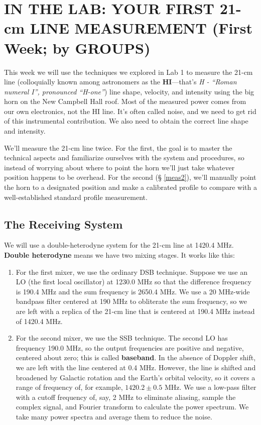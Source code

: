 \documentclass[11pt,preprint]{aastex}
\begin{document}
\section{IN THE LAB: YOUR FIRST 21-cm LINE MEASUREMENT (First Week; by GROUPS)} 
\label{radioastro}

This week we will use the techniques we explored in Lab 1 to measure the
21-cm line (colloquially known among astronomers as the {\bf
  HI}---that's {\it H - ``Roman numeral I'', pronounced ``H-one''}) line
shape, velocity, and intensity using the big horn on the New Campbell Hall roof.
Most of the measured power comes from our own electronics, not the HI
line.  It's often called noise, and we need to get rid of this
instrumental contribution. We also need to obtain the correct line shape
and intensity.

We'll measure the 21-cm line twice. For the first, the goal is to master
the technical aspects and familiarize ourselves with the system and
procedures, so instead of worrying about where to point the horn we'll
just take whatever position happens to be overhead. For the second (\S
\ref{meas2}), we'll manually point the horn to a designated position and
make a calibrated profile to compare with a well-established standard
profile measurement.

\subsection{The Receiving System}
We will use a double-heterodyne system for the 21-cm line at 1420.4 MHz.
{\bf Double heterodyne} means we have two mixing stages.  It works
like this: \begin{enumerate}

\item For the first mixer, we use the ordinary DSB technique. Suppose we
  use an LO (the first local oscillator) at 1230.0 MHz so that the
  difference frequency is 190.4 MHz and the sum frequency is 2650.4 MHz.
  We use a 20 MHz-wide bandpass filter centered at 190 MHz to obliterate
  the sum frequency, so we are left with a replica of the 21-cm line
  that is centered at 190.4 MHz instead of 1420.4 MHz.

\item For the second mixer, we use the SSB technique. The second
  LO has frequency 190.0 MHz, so the output frequencies are positive
  and negative, centered about zero; this is called {\bf baseband}. In the
  absence of Doppler shift, we are left with the line centered at 0.4
  MHz. However, the line is shifted and broadened by Galactic rotation
  and the Earth's orbital velocity, so it covers a range of frequency
  of, for example, $1420.2 \pm 0.5$ MHz. We use a low-pass filter with a
  cutoff frequency of, say, 2 MHz to
  eliminate aliasing, sample the complex signal, and Fourier transform
  to calculate the power spectrum. We take many power spectra and
  average them to reduce the noise.

\end{enumerate}
\end{document}
